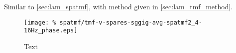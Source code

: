 Similar to \autoref{sec:lam_spatmf}, with method given in \autoref{sec:lam_tmf_method}.

\begin{figure}[htbp]
\centering
    \texttt{[image: \%
spatmf/tmf-v-spares-sggig-avg-spatmf2\_4-16Hz\_phase.eps]}
\caption{%
Text
}%
\label{fig:lam_phs_spatmf}
%
\end{figure}




%
%
%
%
%


